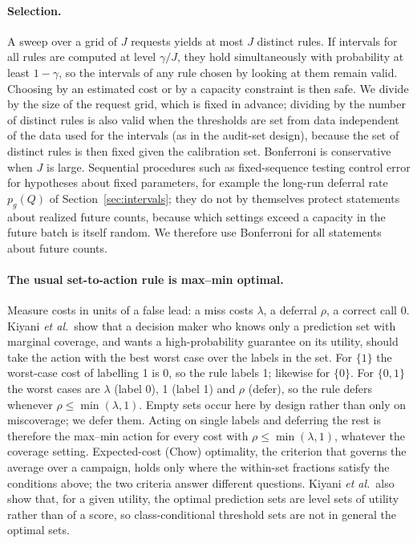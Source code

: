 \documentclass[10pt]{article}
\begin{document}
\paragraph{Selection.} A sweep over a grid of $J$ requests yields at most $J$ distinct rules. If intervals for all rules are computed at level $\gamma/J$, they hold simultaneously with probability at least $1-\gamma$, so the intervals of any rule chosen by looking at them remain valid. Choosing by an estimated cost or by a capacity constraint is then safe. We divide by the size of the request grid, which is fixed in advance; dividing by the number of distinct rules is also valid when the thresholds are set from data independent of the data used for the intervals (as in the audit-set design), because the set of distinct rules is then fixed given the calibration set. Bonferroni is conservative when $J$ is large. Sequential procedures such as fixed-sequence testing\citep{Angelopoulos2021LTT} control error for hypotheses about fixed parameters, for example the long-run deferral rate $p_g(Q)$ of Section~\ref{sec:intervals}; they do not by themselves protect statements about realized future counts, because which settings exceed a capacity in the future batch is itself random. We therefore use Bonferroni for all statements about future counts.

\paragraph{The usual set-to-action rule is max--min optimal.} Measure costs in units of a false lead: a miss costs $\lambda$, a deferral $\rho$, a correct call 0. Kiyani \textit{et al.}\ show that a decision maker who knows only a prediction set with marginal coverage, and wants a high-probability guarantee on its utility, should take the action with the best worst case over the labels in the set.\citep{Kiyani2025RAC} For $\{1\}$ the worst-case cost of labelling 1 is 0, so the rule labels 1; likewise for $\{0\}$. For $\{0,1\}$ the worst cases are $\lambda$ (label 0), 1 (label 1) and $\rho$ (defer), so the rule defers whenever $\rho\le\min(\lambda,1)$. Empty sets occur here by design rather than only on miscoverage; we defer them. Acting on single labels and deferring the rest is therefore the max--min action for every cost with $\rho\le\min(\lambda,1)$, whatever the coverage setting. Expected-cost (Chow) optimality, the criterion that governs the average over a campaign, holds only where the within-set fractions satisfy the conditions above; the two criteria answer different questions. Kiyani \textit{et al.}\ also show that, for a given utility, the optimal prediction sets are level sets of utility rather than of a score, so class-conditional threshold sets are not in general the optimal sets.
\end{document}
